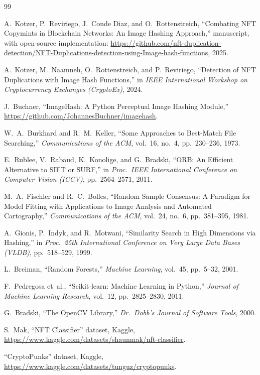 \begin{thebibliography}{99}

 A.~Kotzer, P.~Reviriego, J.~Conde Diaz, and O.~Rottenstreich,
  ``Combating NFT Copymints in Blockchain Networks: An Image Hashing Approach,''
  manuscript, with open-source implementation:
  \url{https://github.com/nft-duplication-detection/NFT-Duplications-detection-using-Image-hash-functions}, 2025.

 A.~Kotzer, M.~Naamneh, O.~Rottenstreich, and P.~Reviriego,
  ``Detection of NFT Duplications with Image Hash Functions,'' in \emph{IEEE International
  Workshop on Cryptocurrency Exchanges (CryptoEx)}, 2024.

 J.~Buchner, ``ImageHash: A Python Perceptual Image Hashing Module,''
  \url{https://github.com/JohannesBuchner/imagehash}.

 W.~A.~Burkhard and R.~M.~Keller, ``Some Approaches to Best-Match File
  Searching,'' \emph{Communications of the ACM}, vol.~16, no.~4, pp.~230--236, 1973.

 E.~Rublee, V.~Rabaud, K.~Konolige, and G.~Bradski, ``ORB: An Efficient
  Alternative to SIFT or SURF,'' in \emph{Proc.\ IEEE International Conference on Computer
  Vision (ICCV)}, pp.~2564--2571, 2011.

 M.~A.~Fischler and R.~C.~Bolles, ``Random Sample Consensus: A Paradigm
  for Model Fitting with Applications to Image Analysis and Automated Cartography,''
  \emph{Communications of the ACM}, vol.~24, no.~6, pp.~381--395, 1981.

 A.~Gionis, P.~Indyk, and R.~Motwani, ``Similarity Search in High
  Dimensions via Hashing,'' in \emph{Proc.\ 25th International Conference on Very Large Data
  Bases (VLDB)}, pp.~518--529, 1999.

 L.~Breiman, ``Random Forests,'' \emph{Machine Learning}, vol.~45,
  pp.~5--32, 2001.

 F.~Pedregosa et~al., ``Scikit-learn: Machine Learning in Python,''
  \emph{Journal of Machine Learning Research}, vol.~12, pp.~2825--2830, 2011.

 G.~Bradski, ``The OpenCV Library,'' \emph{Dr.\ Dobb's Journal of Software
  Tools}, 2000.

 S.~Mak, ``NFT Classifier'' dataset, Kaggle,
  \url{https://www.kaggle.com/datasets/shaunmak/nft-classifier}.

 ``CryptoPunks'' dataset, Kaggle,
  \url{https://www.kaggle.com/datasets/tunguz/cryptopunks}.

\end{thebibliography}
